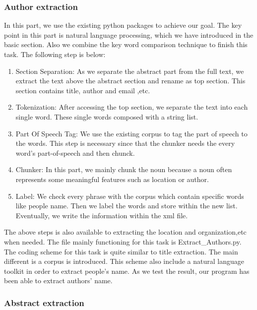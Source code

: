 \subsubsection{Author extraction}

In this part, we use the existing python packages to achieve our goal.
The key point in this part is natural language processing, which we have introduced in the basic section.
Also we combine the key word comparison technique to finish this task.
The following step is below:

\begin{enumerate}
	
	\item Section Separation: As we separate the abstract part from the full text, we extract the text above the 
	abstract section and rename as top section. 
	This section contains title, author and email ,etc.
	\item Tokenization: After accessing the top section, we separate the text into each single word. 
	These single words composed with a string list. 
	\item Part Of Speech Tag: We use the existing corpus to tag the part of speech to the words. 
	This step is necessary since that the chunker needs the every word's part-of-speech and then chunck.
	\item Chunker: In this part, we mainly chunk the noun because a noun often represents some meaningful features 
	such as location or author.
	\item Label: We check every phrase with the corpus which contain specific words like people name. 
	Then we label the words and store within the new list. 
	Eventually, we write the information within the xml file. 
	
\end{enumerate}

The above steps is also available to extracting the location and organization,etc when needed. 
The file mainly functioning for this task is Extract\_Authors.py.
The coding scheme for this task is quite similar to title extraction.
The main different is a corpus is introduced.
This scheme also include a natural language toolkit in order to extract people's name. 
As we test the result, our program has been able to extract authors' name.

\subsubsection{Abstract extraction}

